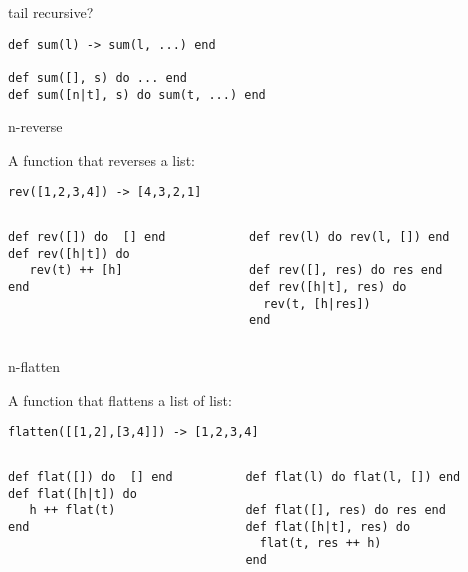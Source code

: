\begin{frame}[fragile]{tail recursive?}

\begin{verbatim}
def sum(l) -> sum(l, ...) end

def sum([], s) do ... end
def sum([n|t], s) do sum(t, ...) end
\end{verbatim}

\end{frame}



\begin{frame}[fragile]{n-reverse}

  A function that reverses a list:

  \hspace{40pt}\verb+rev([1,2,3,4]) -> [4,3,2,1]+
  
\pause

\begin{columns}
  \begin{column}{0.5\linewidth}
\begin{verbatim}
def rev([]) do  [] end
def rev([h|t]) do
   rev(t) ++ [h]
end
\end{verbatim}
  \end{column}
\pause
  \begin{column}{0.5\linewidth}
\begin{verbatim}
def rev(l) do rev(l, []) end

def rev([], res) do res end
def rev([h|t], res) do 
  rev(t, [h|res]) 
end
\end{verbatim}
  \end{column}
  \end{columns}  
\end{frame}


\begin{frame}[fragile]{n-flatten}

  A function that flattens a list of list:

  \hspace{40pt}\verb+flatten([[1,2],[3,4]]) -> [1,2,3,4]+  
\pause

\begin{columns}
  \begin{column}{0.5\linewidth}
\begin{verbatim}
def flat([]) do  [] end
def flat([h|t]) do
   h ++ flat(t)
end
\end{verbatim}
  \end{column}
\pause
  \begin{column}{0.5\linewidth}
\begin{verbatim}
def flat(l) do flat(l, []) end

def flat([], res) do res end
def flat([h|t], res) do 
  flat(t, res ++ h) 
end
\end{verbatim}
  \end{column}
  \end{columns}  
\end{frame}


